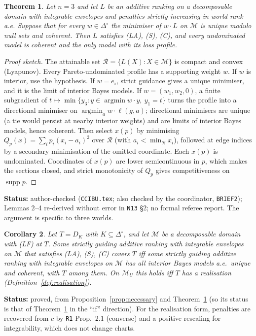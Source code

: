 \documentclass[11pt]{article}
\newtheorem{theorem}{Theorem}[section]
\newtheorem{corollary}[theorem]{Corollary}
\theoremstyle{definition}
\theoremstyle{remark}
\newcommand{\Di}{\Delta^{\circ}}
\newcommand{\M}{\mathcal M}
\newcommand{\supp}{\operatorname{supp}}
\newcommand{\src}[1]{\texttt{#1}}
\newcommand{\status}[1]{\par\smallskip\noindent\textbf{Status:} #1\par\smallskip}
\begin{document}
\begin{theorem}\label{thm:ccibu}
Let $n=3$ and let $L$ be an additive ranking on a decomposable domain with integrable envelopes and penalties strictly increasing in world rank a.e. Suppose that for every $w\in\Di$ the minimiser of $w\cdot L$ on $\M$ is unique modulo null sets and coherent. Then $L$ satisfies (LA), (S), (C), and every undominated model is coherent and the only model with its loss profile.
\end{theorem}
\begin{proof}[Proof sketch]
The attainable set $\mathcal R=\{L(X):X\in\M\}$ is compact and convex (Lyapunov). Every Pareto-undominated profile has a supporting weight $w$. If $w$ is interior, use the hypothesis. If $w=e_i$, strict guidance gives a unique minimiser, and it is the limit of interior Bayes models. If $w=(w_1,w_2,0)$, a finite subgradient of $t\mapsto\min\{y_3:y\in\operatorname{argmin}w\cdot y,\ y_1=t\}$ turns the profile into a directional minimiser on $\operatorname{argmin}_aw\cdot\ell(g,a)$; directional minimisers are unique (a tie would persist at nearby interior weights) and are limits of interior Bayes models, hence coherent. Then select $x(p)$ by minimising $Q_p(x)=\sum_ip_i(x_i-a_i)^2$ over $\mathcal R$ (with $a_i<\min_{\mathcal R}x_i$), followed at edge indices by a secondary minimisation of the omitted coordinate. Each $x(p)$ is undominated. Coordinates of $x(p)$ are lower semicontinuous in $p$, which makes the sections closed, and strict monotonicity of $Q_p$ gives competitiveness on $\supp p$.
\end{proof}
\status{author-checked (\src{CCIBU.tex}; also checked by the coordinator, \src{BRIEF2}); Lemmas 2--4 re-derived without error in \src{N13} \S2; no formal referee report. The argument is specific to three worlds.}

\begin{corollary}\label{cor:realisation}
Let $T=D_K$ with $K\subseteq\Di$, and let $\M$ be a decomposable domain with (LF) at $T$. Some strictly guiding additive ranking with integrable envelopes on $\M$ that satisfies (LA), (S), (C) covers $T$ iff some strictly guiding additive ranking with integrable envelopes on $\M$ has all interior Bayes models a.e.\ unique and coherent, with $T$ among them. On $\M_U$ this holds iff $T$ has a realisation (Definition~\ref{def:realisation}).
\end{corollary}
\status{proved, from Proposition~\ref{prop:necessary} and Theorem~\ref{thm:ccibu} (so its status is that of Theorem~\ref{thm:ccibu} in the ``if'' direction). For the realisation form, penalties are recovered from $c$ by \src{R1} Prop.~2.1 (converse) and a positive rescaling for integrability, which does not change charts.}
\end{document}
